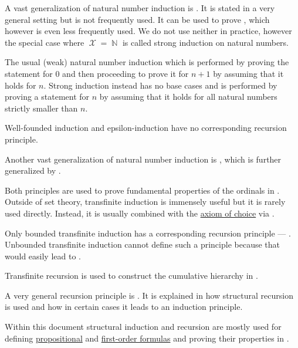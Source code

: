 \begin{remark}
\begin{thmenum}
     A vast generalization of natural number induction is . It is stated in a very general setting but is not frequently used. It can be used to prove , which however is even less frequently used. We do not use neither in practice, however the special case where \( \mscrX = \BbbN \) is called strong induction on natural numbers.

    The usual (weak) natural number induction which is performed by proving the statement for \( 0 \) and then proceeding to prove it for \( n + 1 \) by assuming that it holds for \( n \). Strong induction instead has no base cases and is performed by proving a statement for \( n \) by assuming that it holds for all natural numbers strictly smaller than \( n \).

    Well-founded induction and epsilon-induction have no corresponding recursion principle.

     Another vast generalization of natural number induction is , which is further generalized by .

    Both principles are used to prove fundamental properties of the ordinals in . Outside of set theory, transfinite induction is immensely useful but it is rarely used directly. Instead, it is usually combined with the \hyperref[def:zfc/choice]{axiom of choice} via .

    Only bounded transfinite induction has a corresponding recursion principle --- . Unbounded transfinite induction cannot define such a principle because that would easily lead to .

    Transfinite recursion is used to construct the cumulative hierarchy in .

     A very general recursion principle is . It is explained in  how structural recursion is used and how in certain cases it leads to an induction principle.

    Within this document structural induction and recursion are mostly used for defining \hyperref[def:propositional_syntax/formula]{propositional} and \hyperref[def:first_order_syntax/formula]{first-order formulas} and proving their properties in .
  \end{thmenum}
\end{remark}

